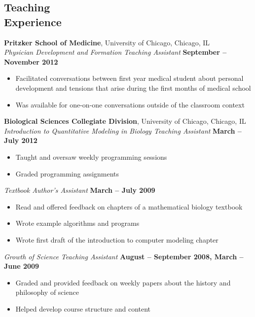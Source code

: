 \documentclass[margin,line]{resume}
\begin{document}
\begin{resume}
    \section{\mysidestyle Teaching\\Experience}
    \textbf{Pritzker School of Medicine}, University of Chicago, Chicago, IL \\\vspace{1mm}%
    \textsl{Physician Development and Formation Teaching Assistant} \hfill \textbf{September -- November 2012}\vspace{1mm}%
    \begin{itemize}
    \item Facilitated conversations between first year medical student about
    personal development and tensions that arise during the first months of
    medical school
    \item Was available for one-on-one conversations outside of the classroom
    context
    \end{itemize}

    \textbf{Biological Sciences Collegiate Division}, University of Chicago, Chicago, IL \\\vspace{1mm}%
    \textsl{Introduction to Quantitative Modeling in Biology Teaching Assistant} \hfill \textbf{March -- July 2012}\vspace{1mm}%
    \begin{itemize}
    \item Taught and oversaw weekly programming sessions
    \item Graded programming assignments
    \end{itemize}

    \textsl{Textbook Author's Assistant} \hfill \textbf{March -- July 2009}\vspace{1mm}%
    \begin{itemize}
    \item Read and offered feedback on chapters of a mathematical biology textbook
    \item Wrote example algorithms and programs
    \item Wrote first draft of the introduction to computer modeling chapter
    \end{itemize}

    \textsl{Growth of Science Teaching Assistant} \hfill \textbf{August -- September 2008, March -- June 2009}
    \begin{itemize}
    \item Graded and provided feedback on weekly papers about the history and philosophy of science
    \item Helped develop course structure and content
    \end{itemize}


\end{resume}
\end{document}
